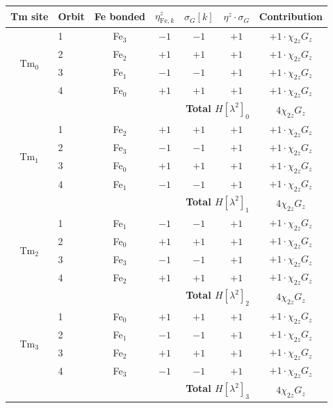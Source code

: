 \documentclass[11pt,a4paper]{article}
\newcommand{\sG}{\sigma_G}
\newcommand{\lamt}{\lambda^2}
\begin{document}
\medskip
\begin{center}
\begin{tabular}{clccccc}
\toprule
Tm site & Orbit & Fe bonded & $\eta^z_{\mathrm{Fe},k}$ & $\sG[k]$ & $\eta^z\cdot\sG$ & Contribution \\
\midrule
\multirow{4}{*}{Tm$_0$}
  & 1 & Fe$_3$ & $-1$ & $-1$ & $+1$ & $+1\cdot\chi_{2z}G_z$ \\
  & 2 & Fe$_2$ & $+1$ & $+1$ & $+1$ & $+1\cdot\chi_{2z}G_z$ \\
  & 3 & Fe$_1$ & $-1$ & $-1$ & $+1$ & $+1\cdot\chi_{2z}G_z$ \\
  & 4 & Fe$_0$ & $+1$ & $+1$ & $+1$ & $+1\cdot\chi_{2z}G_z$ \\
  & & & & \multicolumn{2}{r}{\textbf{Total $H[\lamt]_0$}} & $4\chi_{2z}G_z$ \\
\midrule
\multirow{4}{*}{Tm$_1$}
  & 1 & Fe$_2$ & $+1$ & $+1$ & $+1$ & $+1\cdot\chi_{2z}G_z$ \\
  & 2 & Fe$_3$ & $-1$ & $-1$ & $+1$ & $+1\cdot\chi_{2z}G_z$ \\
  & 3 & Fe$_0$ & $+1$ & $+1$ & $+1$ & $+1\cdot\chi_{2z}G_z$ \\
  & 4 & Fe$_1$ & $-1$ & $-1$ & $+1$ & $+1\cdot\chi_{2z}G_z$ \\
  & & & & \multicolumn{2}{r}{\textbf{Total $H[\lamt]_1$}} & $4\chi_{2z}G_z$ \\
\midrule
\multirow{4}{*}{Tm$_2$}
  & 1 & Fe$_1$ & $-1$ & $-1$ & $+1$ & $+1\cdot\chi_{2z}G_z$ \\
  & 2 & Fe$_0$ & $+1$ & $+1$ & $+1$ & $+1\cdot\chi_{2z}G_z$ \\
  & 3 & Fe$_3$ & $-1$ & $-1$ & $+1$ & $+1\cdot\chi_{2z}G_z$ \\
  & 4 & Fe$_2$ & $+1$ & $+1$ & $+1$ & $+1\cdot\chi_{2z}G_z$ \\
  & & & & \multicolumn{2}{r}{\textbf{Total $H[\lamt]_2$}} & $4\chi_{2z}G_z$ \\
\midrule
\multirow{4}{*}{Tm$_3$}
  & 1 & Fe$_0$ & $+1$ & $+1$ & $+1$ & $+1\cdot\chi_{2z}G_z$ \\
  & 2 & Fe$_1$ & $-1$ & $-1$ & $+1$ & $+1\cdot\chi_{2z}G_z$ \\
  & 3 & Fe$_2$ & $+1$ & $+1$ & $+1$ & $+1\cdot\chi_{2z}G_z$ \\
  & 4 & Fe$_3$ & $-1$ & $-1$ & $+1$ & $+1\cdot\chi_{2z}G_z$ \\
  & & & & \multicolumn{2}{r}{\textbf{Total $H[\lamt]_3$}} & $4\chi_{2z}G_z$ \\
\bottomrule
\end{tabular}
\end{center}
\end{document}
